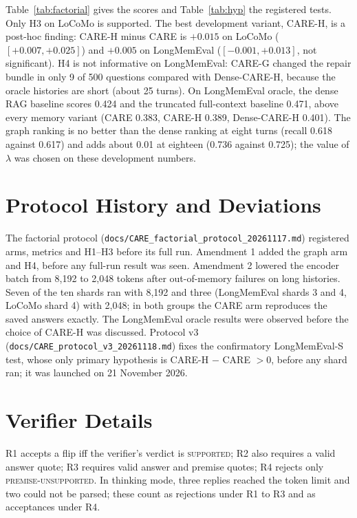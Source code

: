 \documentclass[10pt]{article}
\theoremstyle{plain}
\newcommand{\care}{\textsc{CARE}}
\begin{document}
Table~\ref{tab:factorial} gives the scores and Table~\ref{tab:hyp} the registered tests. Only H3 on LoCoMo is supported. The best development variant, CARE-H, is a post-hoc finding: CARE-H minus \care{} is
$+0.015$ on LoCoMo ($[+0.007,+0.025]$) and $+0.005$ on LongMemEval ($[-0.001,+0.013]$, not significant). H4 is not
informative on LongMemEval: CARE-G changed the repair bundle in only 9 of 500 questions compared with Dense-CARE-H,
because the oracle histories are short (about 25 turns). On LongMemEval oracle, the dense RAG baseline scores 0.424 and
the truncated full-context baseline 0.471, above every memory variant (\care{} 0.383, CARE-H 0.389, Dense-CARE-H 0.401).
The graph ranking is no better than the dense ranking at eight turns (recall 0.618 against 0.617) and adds about 0.01
at eighteen (0.736 against 0.725); the value of $\lambda$ was chosen on these development numbers.

\section{Protocol History and Deviations}
\label{app:protocol}

The factorial protocol (\texttt{docs/CARE\_factorial\_protocol\_20261117.md}) registered arms, metrics and H1--H3
before its full run. Amendment 1 added the graph arm and H4, before any full-run result was seen. Amendment 2
lowered the encoder batch from 8,192 to 2,048 tokens after out-of-memory failures on long histories. Seven of the
ten shards ran with 8,192 and three (LongMemEval shards 3 and 4, LoCoMo shard 4) with 2,048; in both groups the \care{}
arm reproduces the saved answers exactly. The LongMemEval oracle results were observed before the choice of CARE-H was
discussed. Protocol v3 (\texttt{docs/CARE\_protocol\_v3\_20261118.md}) fixes the confirmatory LongMemEval-S test, whose
only primary hypothesis is CARE-H $-$ \care{} $>0$, before any shard ran; it was launched on 21 November 2026.

\section{Verifier Details}
\label{app:verifiers}

R1 accepts a flip iff the verifier's verdict is \textsc{supported}; R2 also requires a valid answer quote; R3
requires valid answer and premise quotes; R4 rejects only \textsc{premise-unsupported}. In thinking mode, three
replies reached the token limit and two could not be parsed; these count as rejections under R1 to R3 and as
acceptances under R4.
\end{document}
